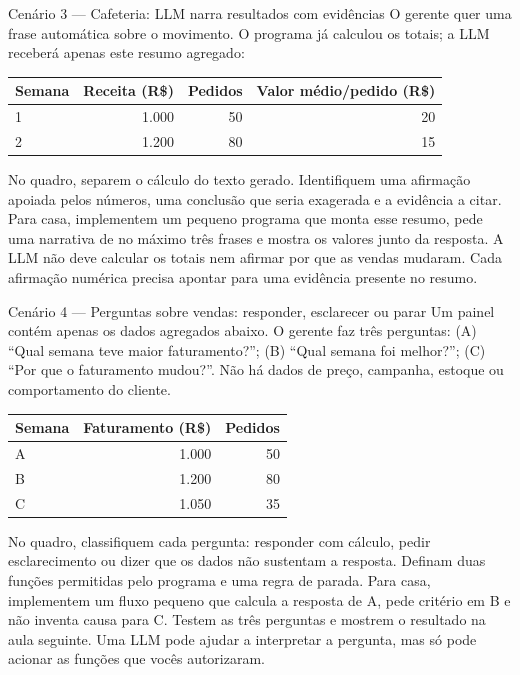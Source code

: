 \documentclass[10pt,a4paper]{article}
\begin{document}
\begin{cenario}{Cenário 3 --- Cafeteria: LLM narra resultados com evidências}
O gerente quer uma frase automática sobre o movimento. O programa já calculou os totais; a LLM receberá apenas este resumo agregado:

\begin{center}\small
\begin{tabular}{l r r r}\toprule
Semana & Receita (R\$) & Pedidos & Valor médio/pedido (R\$) \\\midrule
1 & 1.000 & 50 & 20 \\
2 & 1.200 & 80 & 15 \\\bottomrule
\end{tabular}
\end{center}
\end{cenario}
\begin{pedido}
No quadro, separem o cálculo do texto gerado. Identifiquem uma afirmação apoiada pelos números, uma conclusão que seria exagerada e a evidência a citar. Para casa, implementem um pequeno programa que monta esse resumo, pede uma narrativa de no máximo três frases e mostra os valores junto da resposta. A LLM não deve calcular os totais nem afirmar por que as vendas mudaram. Cada afirmação numérica precisa apontar para uma evidência presente no resumo.
\end{pedido}

\begin{cenario}{Cenário 4 --- Perguntas sobre vendas: responder, esclarecer ou parar}
Um painel contém apenas os dados agregados abaixo. O gerente faz três perguntas: (A) ``Qual semana teve maior faturamento?''; (B) ``Qual semana foi melhor?''; (C) ``Por que o faturamento mudou?''. Não há dados de preço, campanha, estoque ou comportamento do cliente.
\begin{center}\small
\begin{tabular}{l r r}\toprule
Semana & Faturamento (R\$) & Pedidos \\\midrule
A & 1.000 & 50 \\
B & 1.200 & 80 \\
C & 1.050 & 35 \\\bottomrule
\end{tabular}
\end{center}
\end{cenario}
\begin{pedido}
No quadro, classifiquem cada pergunta: responder com cálculo, pedir esclarecimento ou dizer que os dados não sustentam a resposta. Definam duas funções permitidas pelo programa e uma regra de parada. Para casa, implementem um fluxo pequeno que calcula a resposta de A, pede critério em B e não inventa causa para C. Testem as três perguntas e mostrem o resultado na aula seguinte. Uma LLM pode ajudar a interpretar a pergunta, mas só pode acionar as funções que vocês autorizaram.
\end{pedido}
\end{document}
